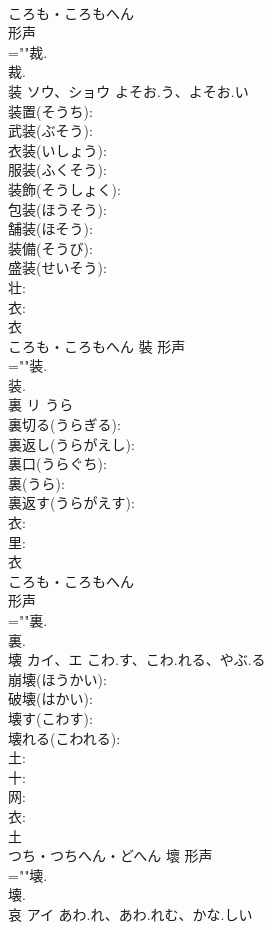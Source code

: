 \documentclass[8pt]{extreport}
\begin{document}
\begin{CJK}{UTF8}{min}
\\	ころも・ころもへん	
\\	形声 
\\	=""裁.
\\	裁.
\\	装	ソウ、ショウ	よそお.う、よそお.い		
\\	装置(そうち): 
\\	武装(ぶそう): 
\\	衣装(いしょう): 
\\	服装(ふくそう): 
\\	装飾(そうしょく): 
\\	包装(ほうそう): 
\\	舗装(ほそう): 
\\	装備(そうび): 
\\	盛装(せいそう): 
\\	壮: 
\\	衣: 
\\	衣	
\\	ころも・ころもへん	裝	形声 
\\	=""装.
\\	装.
\\	裏	リ	うら		
\\	裏切る(うらぎる): 
\\	裏返し(うらがえし): 
\\	裏口(うらぐち): 
\\	裏(うら): 
\\	裏返す(うらがえす): 
\\	衣: 
\\	里: 
\\	衣	
\\	ころも・ころもへん	
\\	形声 
\\	=""裏.
\\	裏.
\\	壊	カイ、エ	こわ.す、こわ.れる、やぶ.る		
\\	崩壊(ほうかい): 
\\	破壊(はかい): 
\\	壊す(こわす): 
\\	壊れる(こわれる): 
\\	土: 
\\	十: 
\\	网: 
\\	衣: 
\\	土	
\\	つち・つちへん・どへん	壞	形声 
\\	=""壊.
\\	壊.
\\	哀	アイ	あわ.れ、あわ.れむ、かな.しい		

\end{CJK}
\end{document}

